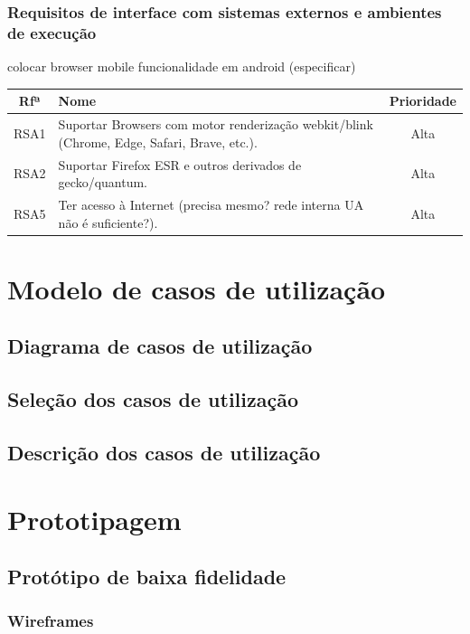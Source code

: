 \documentclass[11pt, twoside]{report}
\begin{document}
	\subsection{Requisitos de interface com sistemas externos e ambientes de execução}
	
	colocar browser mobile
	funcionalidade em android (especificar)
	\begin{table}
		\begin{center}
			\begin{tabularx}{\textwidth}{|c|X|c|}
				\hline
				Rfª & Nome & Prioridade \\
				\hline
				RSA1 & Suportar Browsers com motor renderização webkit/blink (Chrome, Edge, Safari, Brave, etc.).  & Alta \\
				\hline
				RSA2 & Suportar Firefox ESR e outros derivados de gecko/quantum. & Alta \\
				\hline
				RSA5 & Ter acesso à Internet (precisa mesmo? rede interna UA não é suficiente?). & Alta\\
				\hline
			\end{tabularx}
			\label{requisitosdesistemas}
		\end{center}
	\end{table}
		
	
	\chapter{Modelo de casos de utilização}
	\section{Diagrama de casos de utilização}
	\section{Seleção dos casos de utilização}
	\section{Descrição dos casos de utilização}
	
	\chapter{Prototipagem}
	\section{Protótipo de baixa fidelidade}
	\subsection{Wireframes}
\end{document}
